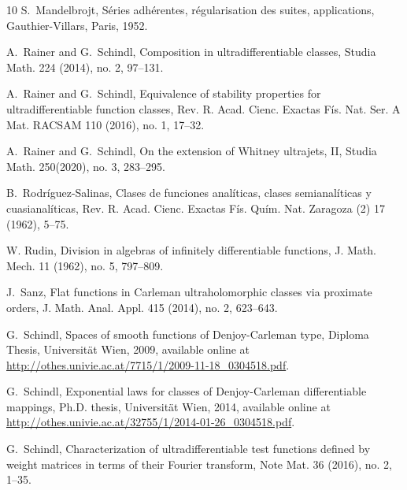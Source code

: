 \documentclass[11pt,a4paper]{article}
\theoremstyle{plain}
\theoremstyle{definition}
\begin{document}
\begin{thebibliography}{10}
	S.~Mandelbrojt, Séries adhérentes, régularisation des suites, applications, Gauthier-Villars, Paris, 1952.
	
	
	A.~Rainer and G.~Schindl, Composition in ultradifferentiable classes, Studia Math. 224 (2014), no. 2, 97--131.
	
	A.~Rainer and G.~Schindl, Equivalence of stability properties for ultradifferentiable function classes, Rev. R. Acad. Cienc. Exactas Fís. Nat. Ser. A Mat. RACSAM 110 (2016), no. 1, 17--32.
	
	
	A.~Rainer and G.~Schindl, On the extension of Whitney ultrajets, II, Studia Math. 250(2020), no. 3, 283--295.
	
	B.~Rodríguez-Salinas, Clases de funciones analíticas, clases semianalíticas y cuasianalíticas, Rev. R. Acad. Cienc. Exactas Fís. Quím. Nat. Zaragoza (2) 17 (1962), 5--75.
	
	 W. Rudin, Division in algebras of infinitely differentiable functions, J. Math. Mech. 11 (1962), no. 5, 797--809.

	J.~Sanz, Flat functions in Carleman ultraholomorphic classes via proximate orders, J. Math. Anal. Appl. 415 (2014), no. 2, 623--643.
	
	G.~Schindl, Spaces of smooth functions of Denjoy-Carleman type, Diploma Thesis, Universität Wien, 2009, available online at
	 \url{http://othes.univie.ac.at/7715/1/2009-11-18_0304518.pdf}.
	
	G.~Schindl, Exponential laws for classes of Denjoy-Carleman differentiable mappings, Ph.D. thesis, Universität Wien, 2014, available online at
	 \url{http://othes.univie.ac.at/32755/1/2014-01-26_0304518.pdf}.
	
	G.~Schindl, Characterization of ultradifferentiable test functions defined by weight matrices in terms of their Fourier transform, Note Mat. 36 (2016), no. 2, 1--35.
	

\end{thebibliography}
\end{document}
